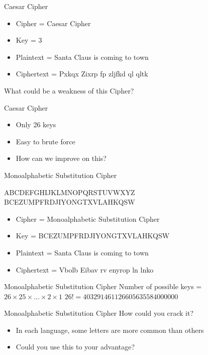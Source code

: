\documentclass{beamer}
\begin{document}
\begin{frame}{Caesar Cipher}
\begin{itemize}
\item Cipher = Caesar Cipher
\item Key = 3
\item Plaintext = Santa Claus is coming to town
\item Ciphertext =  Pxkqx Zixrp fp zljfkd ql qltk
\end{itemize}
What could be a weakness of this Cipher?
\end{frame}

\begin{frame}{Caesar Cipher}
\begin{itemize}
\item Only 26 keys
\item Easy to brute force
\item How can we improve on this?
\end{itemize}
\end{frame}

\begin{frame}{Monoalphabetic Substitution Cipher}
\begin{center}
ABCDEFGHIJKLMNOPQRSTUVWXYZ
BCEZUMPFRDJIYONGTXVLAHKQSW
\end{center}
\begin{itemize}
\item Cipher = Monoalphabetic Substitution Cipher
\item Key = BCEZUMPFRDJIYONGTXVLAHKQSW
\item Plaintext = Santa Claus is coming to town
\item Ciphertext =  Vbolb Eibav rv enyrop ln lnko
\end{itemize}
\end{frame}

\begin{frame}{Monoalphabetic Substitution Cipher}
 Number of possible keys = \( 26\times25\times ... \times2\times1\)
 \newline
\(26! = 403 291 461 126 605 635 584 000 000\)
\end{frame}

\begin{frame}{Monoalphabetic Substitution Cipher}
How could you crack it?
\begin{itemize}
\item In each language, some letters are more common than others
\item Could you use this to your advantage?
\end{itemize}
\end{frame}
\end{document}
